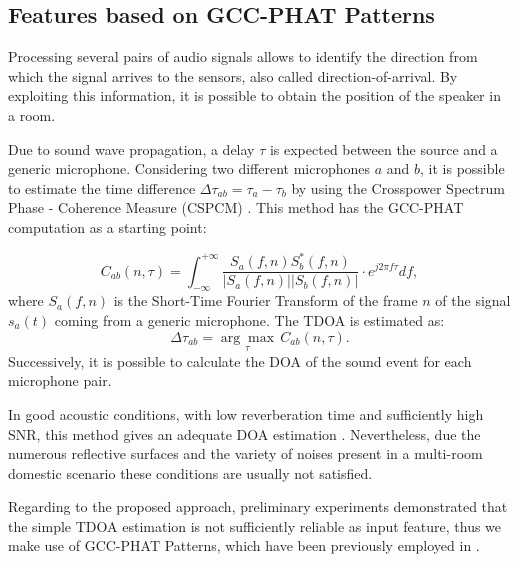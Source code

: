 \documentclass[review]{elsarticle}
\begin{document}
\subsection{Features based on GCC-PHAT Patterns}
\label{sec:features}

Processing several pairs of audio signals allows to identify the direction from which the signal arrives to the sensors, also called direction-of-arrival. By exploiting this information, it is possible to obtain the position of the speaker in a room. 

Due to sound wave propagation, a delay $\tau$ is expected between the source and a generic microphone. Considering two different microphones $a$ and $b$, it is possible to estimate the time difference $\Delta\tau_{ab} = \tau_a -\tau_b$ by using the Crosspower Spectrum Phase - Coherence Measure (CSPCM) \cite{knapp1976generalized}. %
This method has the GCC-PHAT computation as a starting point:

\begin{equation}
\label{eq:CSPCM}
C_{ab}(n,\tau) =  \int_{-\infty}^{+\infty}{\frac{S_a(f,n) S_b^*(f,n)}{|S_a(f,n)| |S_b(f,n)|} \cdot e^{j2 \pi f \tau} df },
\end{equation}
where $S_a(f,n)$ is the Short-Time Fourier Transform of the frame $n$ of the signal $s_a(t)$ coming from a generic microphone. The TDOA is estimated as:
\begin{equation}\label{eq:tdoa}
\Delta\tau_{ab} = \underset{\tau}{\arg \max}\, C_{ab}(n,\tau).
\end{equation}
Successively, it is possible to calculate the DOA of the sound event for each microphone pair. 

In good acoustic conditions, with low reverberation time and sufficiently high SNR, this method gives an adequate DOA estimation \cite{zhang2008Phat}.
Nevertheless, due the numerous reflective surfaces and the variety of noises present in a multi-room domestic scenario these conditions are usually not satisfied.

Regarding to the proposed approach, preliminary experiments demonstrated that the simple TDOA estimation is not sufficiently reliable as input feature, thus we make use of GCC-PHAT Patterns, which have been previously employed in \cite{xiao2015learning}.
\end{document}
